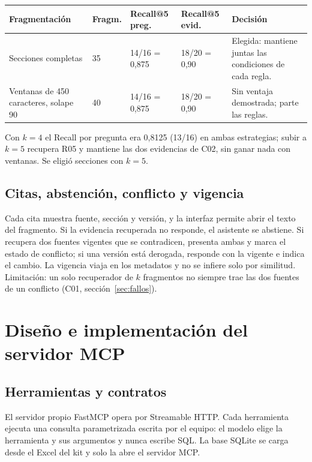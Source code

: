 \documentclass[11pt,a4paper]{article}
\newcommand{\cab}{\rowcolor{azulmira!14}}
\newcommand{\tabla}{\small\rowcolors{2}{white}{grisclaro}}
\begin{document}
\begin{center}\tabla
\begin{tabularx}{\textwidth}{@{}p{3.1cm}p{1.6cm}p{2.3cm}p{2.3cm}Y@{}}
\toprule
\cab\textbf{Fragmentación} & \textbf{Fragm.} & \textbf{Recall@5 preg.} & \textbf{Recall@5 evid.} & \textbf{Decisión}\\
\midrule
Secciones completas & 35 & 14/16 = 0,875 & 18/20 = 0,90 & Elegida: mantiene juntas las condiciones de cada regla.\\
Ventanas de 450 caracteres, solape 90 & 40 & 14/16 = 0,875 & 18/20 = 0,90 & Sin ventaja demostrada; parte las reglas.\\
\bottomrule
\end{tabularx}
\end{center}
Con $k=4$ el Recall por pregunta era 0,8125 (13/16) en ambas estrategias; subir a $k=5$ recupera R05 y mantiene las dos evidencias de C02, sin ganar nada con ventanas. Se eligió secciones con $k=5$.

\subsection{Citas, abstención, conflicto y vigencia}
Cada cita muestra fuente, sección y versión, y la interfaz permite abrir el texto del fragmento. Si la evidencia recuperada no responde, el asistente se abstiene. Si recupera dos fuentes vigentes que se contradicen, presenta ambas y marca el estado de conflicto; si una versión está derogada, responde con la vigente e indica el cambio. La vigencia viaja en los metadatos y no se infiere solo por similitud. Limitación: un solo recuperador de $k$ fragmentos no siempre trae las dos fuentes de un conflicto (C01, sección~\ref{sec:fallos}).

\section{Diseño e implementación del servidor MCP}
\subsection{Herramientas y contratos}
El servidor propio FastMCP opera por Streamable HTTP. Cada herramienta ejecuta una consulta parametrizada escrita por el equipo: el modelo elige la herramienta y sus argumentos y nunca escribe SQL. La base SQLite se carga desde el Excel del kit y solo la abre el servidor MCP.
\end{document}
